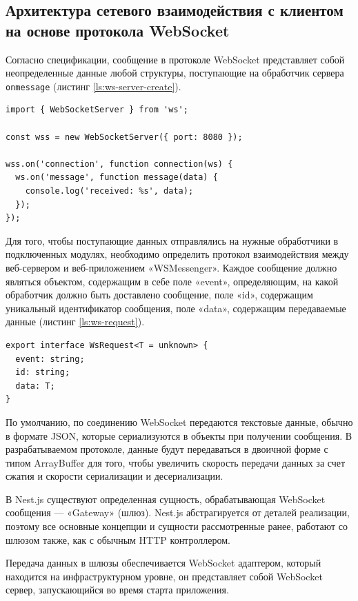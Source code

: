 \subsection{Архитектура сетевого взаимодействия с клиентом на основе протокола WebSocket}

Согласно спецификации, сообщение в протоколе WebSocket представляет собой неопределенные данные любой структуры, поступающие на обработчик сервера \verb|onmessage| (листинг \ref{ls:ws-server-create}).

\begin{lstlisting}[caption={Создание веб-сокет сервера}, label={ls:ws-server-create}]
import { WebSocketServer } from 'ws';

const wss = new WebSocketServer({ port: 8080 });

wss.on('connection', function connection(ws) {
  ws.on('message', function message(data) {
    console.log('received: %s', data);
  });
});
\end{lstlisting}

Для того, чтобы поступающие данных отправлялись на нужные обработчики в подключенных модулях, необходимо определить протокол взаимодействия между веб-сервером и веб-приложением «WSMessenger». Каждое сообщение должно являться объектом, содержащим в себе поле «event», определяющим, на какой обработчик должно быть доставлено сообщение, поле «id», содержащим уникальный идентификатор сообщения, поле «data», содержащим передаваемые данные (листинг \ref{ls:ws-request}).

\begin{lstlisting}[caption={Структура WebSocket запроса}, label={ls:ws-request}]
export interface WsRequest<T = unknown> {
  event: string;
  id: string;
  data: T;
}
\end{lstlisting}

По умолчанию, по соединению WebSocket передаются текстовые данные, обычно в формате JSON, которые сериализуются в объекты при получении сообщения. В разрабатываемом протоколе, данные будут передаваться в двоичной форме с типом ArrayBuffer для того, чтобы увеличить скорость передачи данных за счет сжатия и скорости сериализации и десериализации.

В Nest.js существуют определенная сущность, обрабатывающая WebSocket сообщения — «Gateway» (шлюз). Nest.js абстрагируется от деталей реализации, поэтому все основные концепции и сущности рассмотренные ранее, работают со шлюзом также, как с обычным HTTP контроллером.

Передача данных в шлюзы обеспечивается WebSocket адаптером, который находится на инфраструктурном уровне, он представляет собой WebSocket сервер, запускающийся во время старта приложения.

